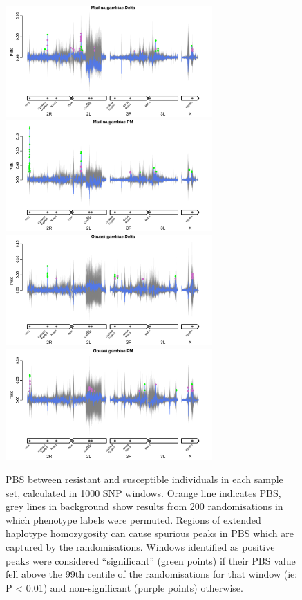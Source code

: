 \documentclass[a4paper,12pt]{article}
\begin{document}
\begin{figure}[h]
	\vskip 0.4cm
	\includegraphics*[width = 7.9cm]{../../randomisations/PBS/Madina.gambiae.Delta_peak_filter_plot.png}
	\includegraphics*[width = 7.9cm]{../../randomisations/PBS/Madina.gambiae.PM_peak_filter_plot.png}
	\vskip 0.4cm
	\includegraphics*[width = 7.9cm]{../../randomisations/PBS/Obuasi.gambiae.Delta_peak_filter_plot.png}
	\includegraphics*[width = 7.9cm]{../../randomisations/PBS/Obuasi.gambiae.PM_peak_filter_plot.png}
	\caption{\footnotesize PBS between resistant and susceptible individuals in each sample set, calculated in 1000 SNP windows. Orange line indicates PBS, grey lines in background show results from 200 randomisations in which phenotype labels were permuted. Regions of extended haplotype homozygosity can cause spurious peaks in PBS which are captured by the randomisations. Windows identified as positive peaks were considered ``significant'' (green points) if their PBS value fell above the 99th centile of the randomisations for that window (ie: P < 0.01) and non-significant (purple points) otherwise.}
	\label{FigS7}
\end{figure}
\end{document}
